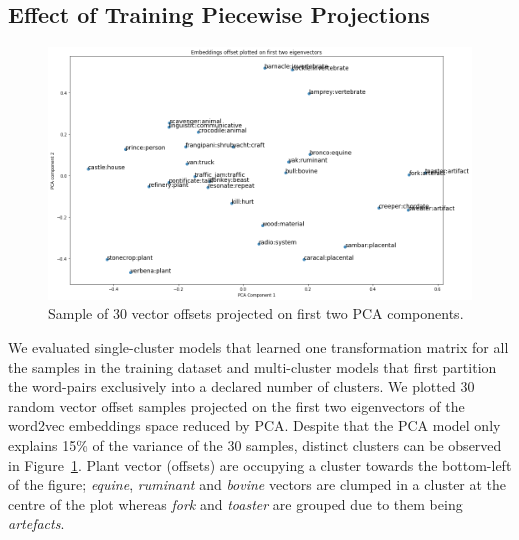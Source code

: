 \subsection{Effect of Training Piecewise Projections}
\begin{figure}[ht!] 
  \centering
  \includegraphics[width=1.\linewidth]{images/Sample_of_30_vector_offsets_PCA.png}
  \caption{Sample of 30 vector offsets projected on first two PCA components.}
  \label{fig:cluster_30_samp_pca}
\end{figure}
We evaluated single-cluster models that learned one transformation matrix for all the samples in the training dataset and multi-cluster models that first partition the word-pairs exclusively into a declared number of clusters.  We plotted 30 random vector offset samples projected on the first two eigenvectors of the word2vec embeddings space reduced by \ac{PCA}.  Despite that the PCA model only explains 15\% of the variance of the 30 samples, distinct clusters can be observed in Figure~\ref{fig:cluster_30_samp_pca}.  Plant vector (offsets) are occupying a cluster towards the bottom-left of the figure; \textit{equine}, \textit{ruminant} and \textit{bovine} vectors are clumped in a cluster at the centre of the plot whereas \textit{fork} and \textit{toaster} are grouped due to them being \textit{artefacts}.

